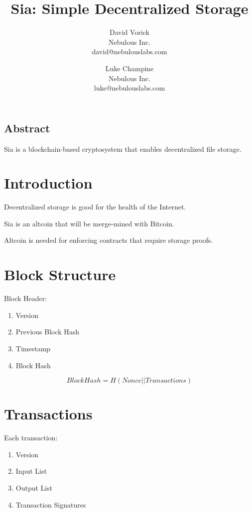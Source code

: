 \documentclass[twocolumn]{article}
\begin{document}
\frenchspacing

\title{Sia: Simple Decentralized Storage}

\author{
{\rm David Vorick}\\
Nebulous Inc.\\
david@nebulouslabs.com
\and
{\rm Luke Champine}\\
Nebulous Inc.\\
luke@nebulouslabs.com
}

\maketitle

\subsection*{Abstract}
Sia is a blockchain-based cryptosystem that enables decentralized file storage.

\section{Introduction}
Decentralized storage is good for the health of the Internet.

Sia is an altcoin that will be merge-mined with Bitcoin.

Altcoin is needed for enforcing contracts that require storage proofs.

\section{Block Structure}
Block Header:
\begin{enumerate}
    \item Version
    \item Previous Block Hash
    \item Timestamp
    \item Block Hash
\end{enumerate}

\[
Block Hash = H(Nonce || Transactions)
\]

\section{Transactions}
Each transaction:
\begin{enumerate}
    \item Version
    \item Input List
    \item Output List
    \item Transaction Signatures
\end{enumerate}
\end{document}
